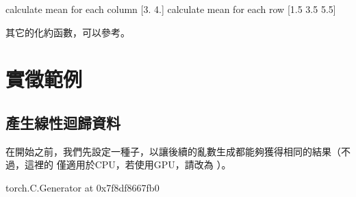 \documentclass[letterpaper,10pt,english]{sphinxmanual}
\begin{document}
\begin{sphinxVerbatim}[commandchars=\\\{\}]
calculate mean for each column 
 [3. 4.]
calculate mean for each row 
 [1.5 3.5 5.5]
\end{sphinxVerbatim}

其它的化約函數，可以參考。


\section{實徵範例}
\label{\detokenize{notebook/lab-torch-tensor:id13}}

\subsection{產生線性迴歸資料}
\label{\detokenize{notebook/lab-torch-tensor:id14}}
在開始之前，我們先設定一種子，以讓後續的亂數生成都能夠獲得相同的結果（不過，這裡的  僅適用於CPU，若使用GPU，請改為 ）。

\begin{sphinxVerbatim}[commandchars=\\\{\}]
\end{sphinxVerbatim}

\begin{sphinxVerbatim}[commandchars=\\\{\}]
\PYGZlt{}torch.\PYGZus{}C.Generator at 0x7f8df8667fb0\PYGZgt{}
\end{sphinxVerbatim}
\end{document}
